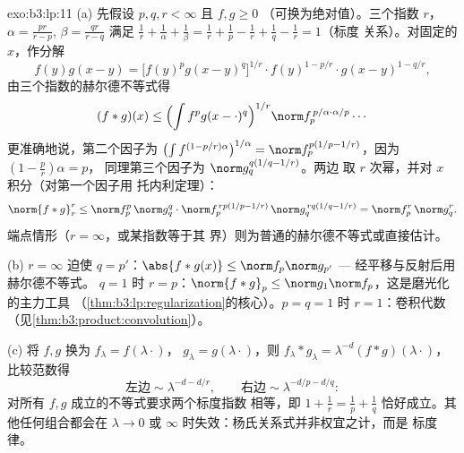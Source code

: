 \begin{solution}{exo:b3:lp:11}
(a) 先假设 $p, q, r < \infty$ 且 $f, g \geq 0$
（可换为绝对值）。三个指数 $r$，
$\alpha = \frac{pr}{r-p}$, $\beta = \frac{qr}{r-q}$
满足 $\frac1r + \frac1\alpha + \frac1\beta = \frac1r +
\frac1p - \frac1r + \frac1q - \frac1r = 1$（标度
关系）。对固定的 $x$，作分解
\[
f(y)g(x-y) = \bigl[f(y)^pg(x-y)^q\bigr]^{1/r}\cdot
f(y)^{1 - p/r}\cdot g(x-y)^{1 - q/r},
\]
由三个指数的赫尔德不等式得
\[
(f*g)(x) \leq \Bigl(\int f^pg(x-\cdot)^q\Bigr)^{1/r}
\norm f_p^{\,p/\alpha\cdot\alpha/p}\cdots
\]
更准确地说，第二个因子为
$\bigl(\int f^{(1-p/r)\alpha}\bigr)^{1/\alpha} =
\norm f_p^{p(1/p - 1/r)}$，因为 $(1 - \frac pr)\alpha = p$，
同理第三个因子为 $\norm g_q^{q(1/q - 1/r)}$。两边
取 $r$ 次幂，并对 $x$ 积分（对第一个因子用
托内利定理）：
\[
\norm{f*g}_r^r \leq \norm f_p^p\,\norm g_q^q\cdot
\norm f_p^{\,rp(1/p - 1/r)}\,\norm g_q^{\,rq(1/q - 1/r)}
= \norm f_p^r\,\norm g_q^r .
\]
端点情形（$r = \infty$，或某指数等于其
界）则为普通的赫尔德不等式或直接估计。

(b) $r = \infty$ 迫使 $q = p'$：$\abs{f*g(x)} \leq \norm
f_p\norm g_{p'}$ --- 经平移与反射后用赫尔德不等式。
$q = 1$ 时 $r = p$：$\norm{f*g}_p \leq \norm
g_1\norm f_p$，这是磨光化的主力工具
（\cref{thm:b3:lp:regularization}的核心）。$p = q = 1$
时 $r = 1$：卷积代数
（见\cref{thm:b3:product:convolution}）。

(c) 将 $f, g$ 换为 $f_\lambda = f(\lambda\cdot)$，
$g_\lambda = g(\lambda\cdot)$，则 $f_\lambda*g_\lambda =
\lambda^{-d}(f*g)(\lambda\cdot)$，比较范数得
\[
\text{左边} \sim \lambda^{-d - d/r}, \qquad
\text{右边} \sim \lambda^{-d/p - d/q} :
\]
对所有 $f, g$ 成立的不等式要求两个标度指数
相等，即 $1 + \frac1r = \frac1p + \frac1q$
恰好成立。其他任何组合都会在 $\lambda \to 0$ 或
$\infty$ 时失效：杨氏关系式并非权宜之计，而是
标度律。
\end{solution}

